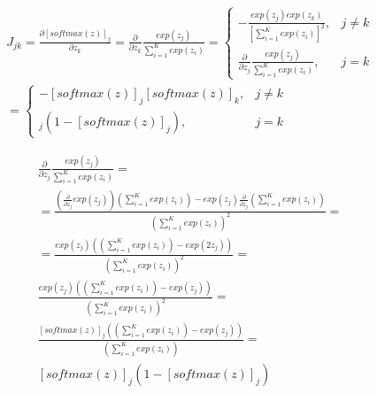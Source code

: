 \documentclass{article}
\begin{document}
\newcommand{\softmax}[2]{ [softmax(#1)]_{#2} }
\begin{multline}
J_{jk} = \frac{\partial \softmax{z}{j}}{\partial z_{k}} =
\frac{\partial}{\partial z_{k}} \frac{exp(z_{j})}{\sum_{i=1}^{K} exp(z_{i})} =
\left\{
\begin{array}{ll}
	-\frac{exp(z_{j}) exp(z_{k})}{\left[ \sum_{i=1}^{K} exp(z_{i}) \right]^{2}}, & j \neq k \\
	\frac{\partial}{\partial z_{j}} \frac{exp(z_{j})}{\sum_{i=1}^{K} exp(z_{i})}, & j = k
\end{array}
\right.
\\ =
\left\{
\begin{array}{ll}
	- \softmax{z}{j} \softmax{z}{k}, & j \neq k \\
	\softmax{z}{j} (1 - \softmax{z}{j}), & j = k
\end{array}
\right.
\end{multline}

\newcommand{\sumezi}{\left(\sum_{i=1}^{K} exp(z_{i}) \right)}
\begin{equation}
\begin{split}
	\frac{\partial}{\partial z_{j}} \frac{exp(z_{j})}{\sum_{i=1}^{K} exp(z_{i})} = \\
=
\frac
	{\left( \frac{\partial}{\partial z_{j}} exp(z_{j}) \right) \sumezi - exp(z_{j}) \frac{\partial}{\partial z_{j}} \sumezi}
	{\sumezi^{2}} = \\
=
\frac
	{exp(z_{j}) \left(\sumezi - exp(2z_j) \right)}
	{ \sumezi ^{2}} = \\
\frac
	{exp(z_{j}) \left(\sumezi - exp(z_j) \right)}
	{\sumezi ^{2}} = \\
\frac
	{\softmax{z}{j} \left(\sumezi - exp(z_{j}) \right)}
	{\sumezi} = \\
\softmax{z}{j} (1 - \softmax{z}{j})
\end{split}
\end{equation}
\end{document}
